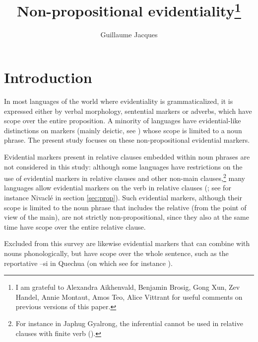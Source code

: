 \documentclass[oneside,a4paper,11pt]{article}
\newcommand{\ipa}[1]{{\phon \mbox{#1}}} %
\begin{document}
 
\sloppy

\title{Non-propositional evidentiality\footnote{I am grateful to Alexandra Aikhenvald, Benjamin Brosig, Gong Xun, Zev Handel, Annie Montaut, Amos Teo, Alice Vittrant for useful comments on previous versions of this paper.}}
 
\author{Guillaume Jacques}
\maketitle


\section{Introduction}
In most languages of the world where evidentiality is grammaticalized, it is expressed either by verbal morphology, sentential markers or adverbs, which have scope over the entire proposition. A minority of languages have evidential-like distinctions on markers (mainly deictic, see \citealt[130]{aikhenvald06}) whose scope is limited to a noun phrase. The present study focuses on these non-propositional evidential markers.

Evidential markers present in relative clauses embedded within noun phrases are not considered in this study: although some languages have restrictions on the use of evidential markers in relative clauses and other non-main clauses,\footnote{For instance in Japhug Gyalrong, the inferential cannot be used in relative clauses with finite verb (\citealt{jacques16relatives}).} many languages allow evidential markers on the verb in relative clauses (\citealt[253-6]{aikhenvald06}; see for instance Nivaclé in section \ref{sec:prop}). Such evidential markers, although their scope is limited to the noun phrase that includes the relative (from the point of view of the main), are not strictly non-propositional, since they also at the same time have scope over the entire relative clause.


Excluded from this survey are likewise evidential markers that can combine with nouns phonologically, but have scope over the whole sentence, such as the reportative  \ipa{--si} in Quechua (on which see for instance \citealt{faller02cuzco}).
\end{document}
